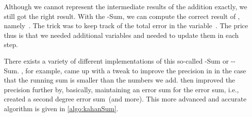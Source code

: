 %
Although we cannot represent the intermediate results of the addition exactly, we still got the right result.
With the \citeauthor{K1965PFRORTE}-Sum, we can compute the correct result of , namely~.
The trick was to keep track of the total error in the variable~.
The price thus is that we needed additional variables and needed to update them in each step.%
%
\FloatBarrier%
%

There exists a variety of different implementations of this so-called \citeauthor{K1965PFRORTE}-Sum or \citeauthor{K1965PFRORTE}-\citeauthor{B1968NSIMA}-Sum.
, for example, came up with a tweak to improve the precision in \citeyear{N1974REVZSES} in the case that the running sum is smaller than the numbers we add.
 then improved the precision further by, basically, maintaining an error sum for the error sum, i.e., created a second degree error sum~(and more).
This more advanced and accurate algorithm is given in \cref{algo:kahanSum}.

